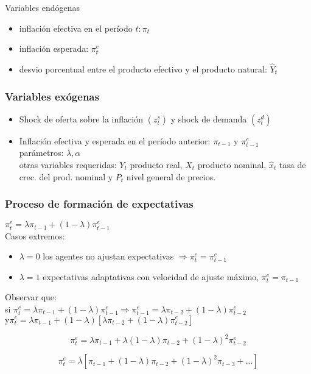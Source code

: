 \documentclass[11pt]{beamer}
\begin{document}
	
	\begin{frame}{Variables endógenas}
		\begin{itemize}
			\item inflación efectiva en el período $t: \pi_{t}$
			\item inflación esperada: $\pi_{t}^{e}$
			\item desvio porcentual entre el producto efectivo y el producto natural: $\widehat{Y}_{t}$
		\end{itemize}
		
	\end{frame}

		
\begin{frame}[allowframebreaks]
			\frametitle{Variables exógenas}
			\begin{itemize}
				\item Shock de oferta sobre la inflación $\left(z_{t}^{s}\right)$ y shock de demanda $\left(z_{t}^{d}\right)$
				\item Inflación efectiva y esperada en el período anterior: $\pi_{t-1}$ y $\pi_{t-1}^{e}$\\
				parámetros: $\lambda, \alpha$\\
				otras variables requeridas: $Y_{t}$ producto real, $X_{t}$ producto nominal, $\widehat{x}_{t}$ tasa de crec. del prod. nominal y $P_{t}$ nivel general de precios.
			\end{itemize}
		\end{frame}
  \begin{frame}[allowframebreaks]
  \frametitle{Proceso de formación de expectativas}
      $\pi_{t}^{e}=\lambda \pi_{t-1}+(1-\lambda) \pi_{t-1}^{e}$\\
			Casos extremos:
			
			\begin{itemize}
				\item $\lambda=0$ los agentes no ajustan expectativas $\Rightarrow \pi_{t}^{e}=\pi_{t-1}^{e}$
				\item $\lambda=1$ expectativas adaptativas con velocidad de ajuste máximo, $\pi_{t}^{e}=\pi_{t-1}$
			\end{itemize}
			
			Observar que:\\
			si $\pi_{t}^{e}=\lambda \pi_{t-1}+(1-\lambda) \pi_{t-1}^{e} \Rightarrow \pi_{t-1}^{e}=\lambda \pi_{t-2}+(1-\lambda) \pi_{t-2}^{e}$\\
			$\mathrm{y} \pi_{t}^{e}=\lambda \pi_{t-1}+(1-\lambda)\left[\lambda \pi_{t-2}+(1-\lambda) \pi_{t-2}^{e}\right]$
			
			$$
			\pi_{t}^{e}=\lambda \pi_{t-1}+\lambda(1-\lambda) \pi_{t-2}+(1-\lambda)^{2} \pi_{t-2}^{e}
			$$
			
			$$
			\pi_{t}^{e}=\lambda\left[\pi_{t-1}+(1-\lambda) \pi_{t-2}+(1-\lambda)^{2} \pi_{t-3}+\ldots\right]
			$$
	\end{frame}
\end{document}
